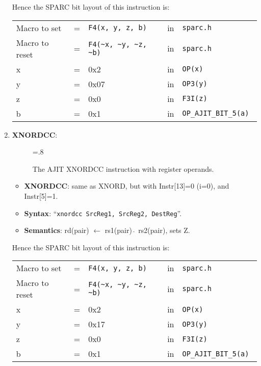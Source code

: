 \begin{enumerate}
  Hence the SPARC bit layout of this instruction is:

  \begin{tabular}[h]{lclcl}
    Macro to set   &=&  \verb|F4(x, y, z, b)|     &in& \verb|sparc.h|     \\
    Macro to reset &=&  \verb|F4(~x, ~y, ~z, ~b)| &in& \verb|sparc.h|     \\
    x              &=& 0x2                        &in& \verb|OP(x) | \\
    y              &=& 0x07                       &in& \verb|OP3(y) | \\
    z              &=& 0x0                        &in& \verb|F3I(z) | \\
    b              &=& 0x1                        &in& \verb|OP_AJIT_BIT_5(a) |
  \end{tabular}

\item \textbf{XNORDCC}:\\
  \begin{center}
    \begin{figure}[h]
      \centering
      \epsfxsize=.8\linewidth
      \caption{The AJIT XNORDCC instruction  with register operands.}
      \label{fig:ajit:xnordcc:insn}
    \end{figure}
  \end{center}
  \begin{itemize}
  \item []\textbf{XNORDCC}: same as XNORD, but with Instr[13]=0 (i=0), and
    Instr[5]=1.
  \item []\textbf{Syntax}: ``\texttt{xnordcc  SrcReg1, SrcReg2, DestReg}''.
  \item []\textbf{Semantics}: rd(pair) $\leftarrow$ rs1(pair) $\hat{~}$
    rs2(pair), sets Z.
  \end{itemize}

  Hence the SPARC bit layout of this instruction is:

  \begin{tabular}[h]{lclcl}
    Macro to set   &=&  \verb|F4(x, y, z, b)|     &in& \verb|sparc.h|     \\
    Macro to reset &=&  \verb|F4(~x, ~y, ~z, ~b)| &in& \verb|sparc.h|     \\
    x              &=& 0x2                        &in& \verb|OP(x) | \\
    y              &=& 0x17                       &in& \verb|OP3(y) | \\
    z              &=& 0x0                        &in& \verb|F3I(z) | \\
    b              &=& 0x1                        &in& \verb|OP_AJIT_BIT_5(a) |
  \end{tabular}


\end{enumerate}
